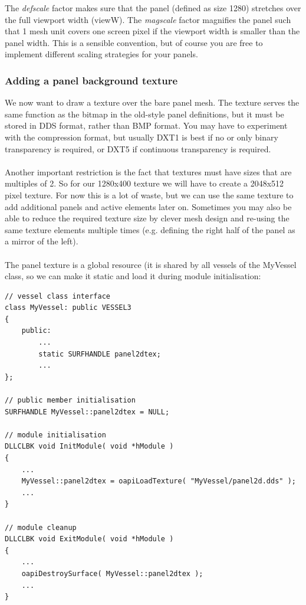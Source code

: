 \documentclass[Orbiter Developer Manual.tex]{subfiles}
\begin{document}
\noindent
The \textit{defscale} factor makes sure that the panel (defined as size 1280) stretches over the full viewport width (viewW). The \textit{magscale} factor magnifies the panel such that 1 mesh unit covers one screen pixel if the viewport width is smaller than the panel width. This is a sensible convention, but of course you are free to implement different scaling strategies for your panels.


\subsubsection{Adding a panel background texture}
We now want to draw a texture over the bare panel mesh. The texture serves the same function as the bitmap in the old-style panel definitions, but it must be stored in DDS format, rather than BMP format. You may have to experiment with the compression format, but usually DXT1 is best if no or only binary transparency is required, or DXT5 if continuous transparency is required.\\
\\
Another important restriction is the fact that textures must have sizes that are multiples of 2. So for our 1280x400 texture we will have to create a 2048x512 pixel texture. For now this is a lot of waste, but we can use the same texture to add additional panels and active elements later on. Sometimes you may also be able to reduce the required texture size by clever mesh design and re-using the same texture elements multiple times (e.g. defining the right half of the panel as a mirror of the left).\\
\\
The panel texture is a global resource (it is shared by all vessels of the MyVessel class, so we can make it static and load it during module initialisation:

\begin{lstlisting}
// vessel class interface
class MyVessel: public VESSEL3
{
	public:
		...
		static SURFHANDLE panel2dtex;
		...
};

// public member initialisation
SURFHANDLE MyVessel::panel2dtex = NULL;

// module initialisation
DLLCLBK void InitModule( void *hModule )
{
	...
	MyVessel::panel2dtex = oapiLoadTexture( "MyVessel/panel2d.dds" );
	...
}

// module cleanup
DLLCLBK void ExitModule( void *hModule )
{
	...
	oapiDestroySurface( MyVessel::panel2dtex );
	...
}
\end{lstlisting}
\end{document}
